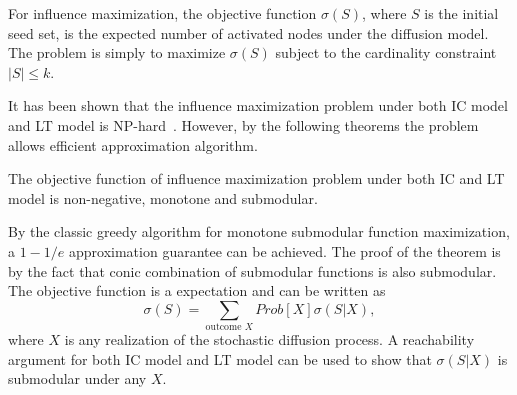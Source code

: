 %

For influence maximization, the objective function $\sigma(S)$, where $S$ is the initial seed set, is the expected number of activated nodes under the diffusion model. The problem is simply to maximize $\sigma(S)$ subject to the cardinality constraint $|S|\leq k$.

It has been shown that the influence maximization problem under both IC model and LT model is NP-hard~\cite{KKT03}. However, by the following theorems the problem allows efficient approximation algorithm.
 \begin{theorem}\label{Thm:KKT}
The objective function of influence maximization problem under both IC and LT model is non-negative, monotone and submodular.
\end{theorem}
By the classic greedy algorithm for monotone submodular function maximization, a $1-1/e$ approximation guarantee can be achieved. The proof of the theorem is by the fact that conic combination of submodular functions is also submodular. The objective function is a expectation and can be written as
$$
\sigma(S) = \sum_{\text{outcome }X}Prob[X]\sigma(S|X),
$$
where $X$ is any realization of the stochastic diffusion process. A reachability argument for both IC model and LT model can be used to show that $\sigma(S|X)$ is submodular under any $X$. 

